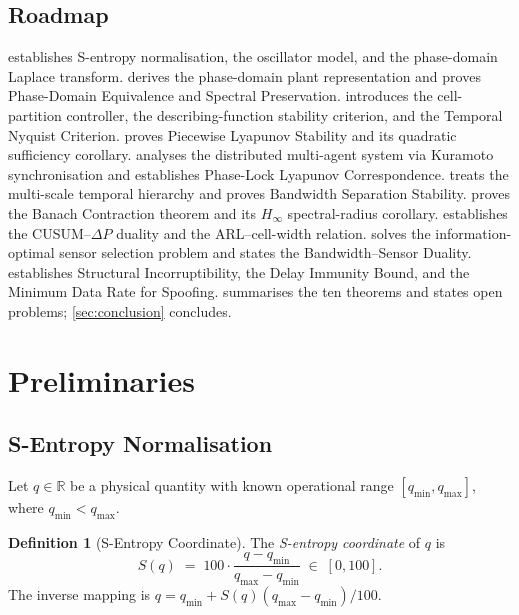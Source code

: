 \documentclass[10pt,twocolumn]{article}
\theoremstyle{plain}
\theoremstyle{definition}
\newtheorem{definition}[theorem]{Definition}
\theoremstyle{remark}
\newcommand{\R}{\mathbb{R}}
\newcommand{\DeltaP}{\Delta P}
\begin{document}
\subsection*{Roadmap}

 establishes S-entropy normalisation, the oscillator
model, and the phase-domain Laplace transform.
 derives the phase-domain plant representation and
proves Phase-Domain Equivalence and Spectral Preservation.
 introduces the cell-partition controller, the
describing-function stability criterion, and the Temporal Nyquist
Criterion.
 proves Piecewise Lyapunov Stability and its quadratic
sufficiency corollary.
 analyses the distributed multi-agent system via
Kuramoto synchronisation and establishes Phase-Lock Lyapunov
Correspondence.
 treats the multi-scale temporal hierarchy and
proves Bandwidth Separation Stability.
 proves the Banach Contraction theorem and its
$H_\infty$ spectral-radius corollary.
 establishes the CUSUM--$\DeltaP$ duality and the
ARL--cell-width relation.
 solves the information-optimal sensor selection
problem and states the Bandwidth--Sensor Duality.
 establishes Structural Incorruptibility, the
Delay Immunity Bound, and the Minimum Data Rate for Spoofing.
 summarises the ten theorems and states open
problems; \cref{sec:conclusion} concludes.

\section{Preliminaries}
\label{sec:prelim}

\subsection{S-Entropy Normalisation}
\label{ssec:sentropy}

Let $q \in \R$ be a physical quantity with known operational range
$[q_{\min}, q_{\max}]$, where $q_{\min} < q_{\max}$.

\begin{definition}[S-Entropy Coordinate]
\label{def:sentropy}
The \emph{S-entropy coordinate} of $q$ is
\begin{equation}
  S(q) \;=\; 100 \cdot \frac{q - q_{\min}}{q_{\max} - q_{\min}}
         \;\in\; [0,100].
  \label{eq:sentropy}
\end{equation}
The inverse mapping is $q = q_{\min} + S(q)(q_{\max}-q_{\min})/100$.
\end{definition}
\end{document}
